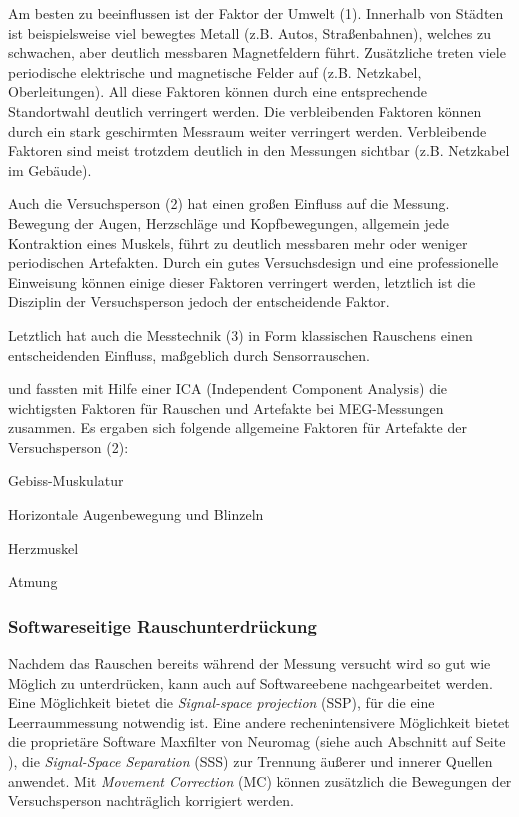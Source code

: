 \documentclass[doc,a4paper,12pt]{apa6}
\makeatletter
\DeclareRobustCommand*{\nameref}[1]{%
      \glqq{\myorg@nameref{#1}}\grqq%
    }%
\makeatother
\begin{document}
Am besten zu beeinflussen ist der Faktor der Umwelt (1). Innerhalb von Städten ist beispielsweise viel bewegtes Metall (z.B. Autos, Straßenbahnen), welches zu schwachen, aber deutlich messbaren Magnetfeldern führt. Zusätzliche treten viele periodische elektrische und magnetische Felder auf (z.B. Netzkabel, Oberleitungen). All diese Faktoren können durch eine entsprechende Standortwahl deutlich verringert werden. Die verbleibenden Faktoren können durch ein stark geschirmten Messraum weiter verringert werden. Verbleibende Faktoren sind meist trotzdem deutlich in den Messungen sichtbar (z.B. Netzkabel im Gebäude).

Auch die Versuchsperson (2) hat einen großen Einfluss auf die Messung. Bewegung der Augen, Herzschläge und Kopfbewegungen, allgemein jede Kontraktion eines Muskels, führt zu deutlich messbaren mehr oder weniger periodischen Artefakten. Durch ein gutes Versuchsdesign und eine professionelle Einweisung können einige dieser Faktoren verringert werden, letztlich ist die Disziplin der Versuchsperson jedoch der entscheidende Faktor.

Letztlich hat auch die Messtechnik (3) in Form klassischen Rauschens einen entscheidenden Einfluss, maßgeblich durch Sensorrauschen.

\textcite{vigario1998independent} und \textcite{vigario2000independent} fassten mit Hilfe einer ICA (Independent Component Analysis) die wichtigsten Faktoren für Rauschen und Artefakte bei MEG-Messungen zusammen. Es ergaben sich folgende allgemeine Faktoren für Artefakte der Versuchsperson (2):

\begin{compactitem}
\item Gebiss-Muskulatur
\item Horizontale Augenbewegung und Blinzeln
\item Herzmuskel
\item Atmung
\end{compactitem}

\subsubsection{Softwareseitige Rauschunterdrückung}
\label{sec:maxfilter}

Nachdem das Rauschen bereits während der Messung versucht wird so gut wie Möglich zu unterdrücken, kann auch auf Softwareebene nachgearbeitet werden. Eine Möglichkeit bietet die \emph{Signal-space projection} (SSP), für die eine Leerraummessung notwendig ist. Eine andere rechenintensivere Möglichkeit bietet die proprietäre Software Maxfilter von Neuromag (siehe auch Abschnitt \nameref{sec:software} auf Seite \pageref{sec:software}), die \emph{Signal-Space Separation} (SSS) zur Trennung äußerer und innerer Quellen anwendet. Mit \emph{Movement Correction} (MC) können zusätzlich die Bewegungen der Versuchsperson nachträglich korrigiert werden.
\end{document}
